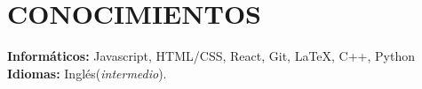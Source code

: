 \documentclass[12pt,a4paper,roman,colorlinks,linkcolor=true]{moderncv}        %
\begin{document}
{\section{CONOCIMIENTOS}
  \textbf{Informáticos:} Javascript, HTML/CSS, React, Git, \LaTeX, C++, Python \\
  \textbf{Idiomas:} Inglés(\textit{intermedio}).




      
}
\nocite{*}



\end{document}
